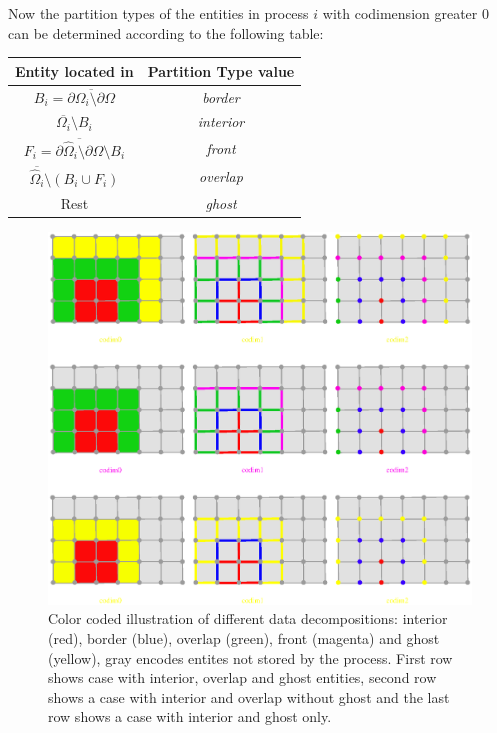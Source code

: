 \documentclass[11pt,a4paper,headinclude,footinclude,DIV16,normalheadings]{scrreprt}
\begin{document}
Now the partition types of the entities in process $i$ 
with codimension greater 0 can
be determined according to the following table:
\begin{center}
\begin{tabular}{cc}
\hline
\hline
Entity located in & Partition Type value\\
\hline
$B_i=\overline{\partial\Omega_i\setminus\partial\Omega}$ &
\textit{border}\\
$\overline{\Omega_i}\setminus B_i$ & \textit{interior}\\
$F_i =
\overline{\partial\hat{\Omega}_i\setminus\partial\Omega}\setminus B_i$
& \textit{front}\\
$\overline{\hat{\Omega}_i}\setminus(B_i\cup F_i)$ & \textit{overlap}\\
Rest & \textit{ghost}\\
\hline
\hline
\end{tabular}
\end{center}

\begin{figure}

\begin{center}
\includegraphics[width=\textwidth]{./EPS/partitionsingle}
\end{center}

\caption{Color coded illustration of different data decompositions:
  interior (red), border (blue), overlap (green), front (magenta) and
  ghost (yellow), gray encodes entites not stored by the
  process. First row shows case with interior, overlap and ghost
  entities, second row shows a case with interior and overlap without
  ghost and the last row shows a case with interior and ghost only.}
\label{Fig:PartitionSingle}
\end{figure}
\end{document}
